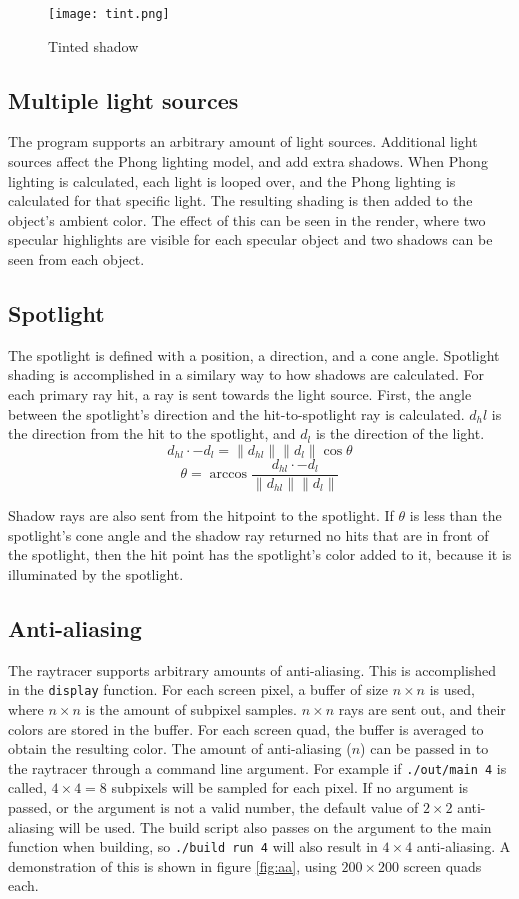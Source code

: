 \documentclass[11pt]{article}
\newcommand{\norm}[1]{\left\lVert#1\right\rVert}
\begin{document}
\begin{figure}
    \centering
    \texttt{[image: tint.png]}
    \caption{Tinted shadow}
    \label{fig:tint}
\end{figure}

\subsection{Multiple light sources}
The program supports an arbitrary amount of light sources. Additional light sources affect the Phong lighting model, and add extra shadows. When Phong lighting is calculated, each light is looped over, and the Phong lighting is calculated for that specific light. The resulting shading is then added to the object's ambient color. The effect of this can be seen in the render, where two specular highlights are visible for each specular object and two shadows can be seen from each object.

\subsection{Spotlight}
The spotlight is defined with a position, a direction, and a cone angle. Spotlight shading is accomplished in a similary way to how shadows are calculated. For each primary ray hit, a ray is sent towards the light source. First, the angle between the spotlight's direction and the hit-to-spotlight ray is calculated. $d_hl$ is the direction from the hit to the spotlight, and $d_l$ is the direction of the light.
$$d_{hl} \cdot -d_l = \norm{d_{hl}}\norm{d_l}\cos\theta$$
$$\theta = \arccos \frac{d_{hl} \cdot -d_l}{\norm{d_{hl}}\norm{d_l}}$$

Shadow rays are also sent from the hitpoint to the spotlight. If $\theta$ is less than the spotlight's cone angle and the shadow ray returned no hits that are in front of the spotlight, then the hit point has the spotlight's color added to it, because it is illuminated by the spotlight.

\subsection{Anti-aliasing}
The raytracer supports arbitrary amounts of anti-aliasing. This is accomplished in the \verb|display| function. For each screen pixel, a buffer of size $n\times n$ is used, where $n\times n$ is the amount of subpixel samples. $n\times n$ rays are sent out, and their colors are stored in the buffer. For each screen quad, the buffer is averaged to obtain the resulting color. The amount of anti-aliasing ($n$) can be passed in to the raytracer through a command line argument. For example if \verb|./out/main 4| is called, $4\times4=8$ subpixels will be sampled for each pixel. If no argument is passed, or the argument is not a valid number, the default value of $2\times2$ anti-aliasing will be used. The build script also passes on the argument to the main function when building, so \verb|./build run 4| will also result in $4\times 4$ anti-aliasing. A demonstration of this is shown in figure \ref{fig:aa}, using $200\times 200$ screen quads each.
\end{document}
